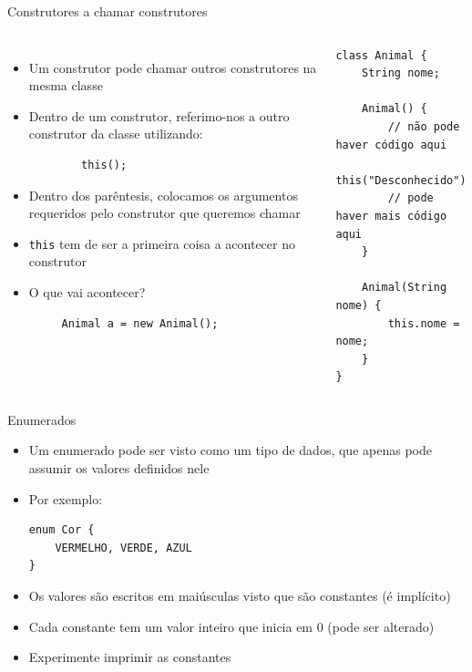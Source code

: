 \documentclass[portuguese, aspectratio=169, xcolor=table]{beamer}
\begin{document}
\begin{frame}[fragile]{Construtores a chamar construtores}
\begin{columns}
\begin{itemize}
    \item Um construtor pode chamar outros construtores na mesma classe
    \item Dentro de um construtor, referimo-nos a outro construtor da classe utilizando:
    \begin{verbatim}
        this();
    \end{verbatim}
    \item Dentro dos parêntesis, colocamos os argumentos requeridos pelo construtor que queremos chamar
    \item \texttt{this} tem de ser a primeira coisa a acontecer no construtor
    \item O que vai acontecer?
    \begin{verbatim}
     Animal a = new Animal();
    \end{verbatim}
\end{itemize}
\begin{verbatim}
class Animal {
    String nome;

    Animal() {
        // não pode haver código aqui
        this("Desconhecido");
        // pode haver mais código aqui
    }

    Animal(String nome) {
        this.nome = nome;
    }
}
\end{verbatim}
\end{columns}
\end{frame}






\begin{frame}[fragile]{Enumerados}
\begin{itemize}
\item Um enumerado pode ser visto como um tipo de dados, que apenas pode assumir os valores definidos nele
\item Por exemplo:
\begin{verbatim}
enum Cor {
    VERMELHO, VERDE, AZUL
}
\end{verbatim}
\item Os valores são escritos em maiúsculas visto que são constantes (é implícito)
\item Cada constante tem um valor inteiro que inicia em 0 (pode ser alterado)
\item Experimente imprimir as constantes
\end{itemize}

\end{frame}
\end{document}
